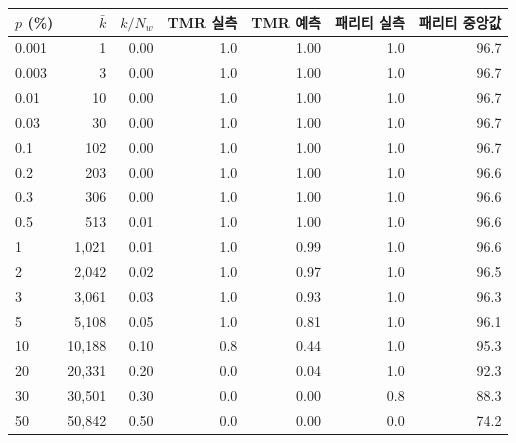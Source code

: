 \begin{tabular}{lrr|rr|rr}
\toprule
$p$ (\%) & $\bar{k}$ & $k/N_w$ & TMR 실측 & TMR 예측 & 패리티 실측 & 패리티 중앙값 \\
\midrule
0.001 & 1 & 0.00 & 1.0 & 1.00 & 1.0 & 96.7 \\
0.003 & 3 & 0.00 & 1.0 & 1.00 & 1.0 & 96.7 \\
0.01 & 10 & 0.00 & 1.0 & 1.00 & 1.0 & 96.7 \\
0.03 & 30 & 0.00 & 1.0 & 1.00 & 1.0 & 96.7 \\
0.1 & 102 & 0.00 & 1.0 & 1.00 & 1.0 & 96.7 \\
0.2 & 203 & 0.00 & 1.0 & 1.00 & 1.0 & 96.6 \\
0.3 & 306 & 0.00 & 1.0 & 1.00 & 1.0 & 96.6 \\
0.5 & 513 & 0.01 & 1.0 & 1.00 & 1.0 & 96.6 \\
1 & 1,021 & 0.01 & 1.0 & 0.99 & 1.0 & 96.6 \\
2 & 2,042 & 0.02 & 1.0 & 0.97 & 1.0 & 96.5 \\
3 & 3,061 & 0.03 & 1.0 & 0.93 & 1.0 & 96.3 \\
5 & 5,108 & 0.05 & 1.0 & 0.81 & 1.0 & 96.1 \\
10 & 10,188 & 0.10 & 0.8 & 0.44 & 1.0 & 95.3 \\
20 & 20,331 & 0.20 & 0.0 & 0.04 & 1.0 & 92.3 \\
30 & 30,501 & 0.30 & 0.0 & 0.00 & 0.8 & 88.3 \\
50 & 50,842 & 0.50 & 0.0 & 0.00 & 0.0 & 74.2 \\
\bottomrule
\end{tabular}
